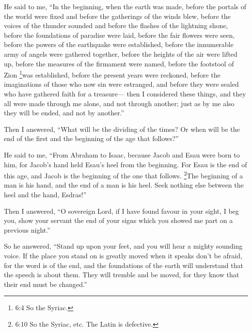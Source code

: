 He said to me, ``In the beginning, when the earth was made,
before the portals of the world were fixed and before the gatherings of
the winds blew,  before the voices of the thunder sounded
and before the flashes of the lightning shone, before the foundations of
paradise were laid,  before the fair flowers were seen,
before the powers of the earthquake were established, before the
innumerable army of angels were gathered together,  before
the heights of the air were lifted up, before the measures of the
firmament were named, before the footstool of Zion \footnote{6:4 So the
  Syriac.}was established,  before the present years were
reckoned, before the imaginations of those who now sin were estranged,
and before they were sealed who have gathered faith for a treasure---
 then I considered these things, and they all were made
through me alone, and not through another; just as by me also they will
be ended, and not by another.''

 Then I answered, ``What will be the dividing of the times?
Or when will be the end of the first and the beginning of the age that
follows?''

 He said to me, ``From Abraham to Isaac, because Jacob and
Esau were born to him, for Jacob's hand held Esau's heel from the
beginning.  For Esau is the end of this age, and Jacob is
the beginning of the one that follows.  \footnote{6:10 So
  the Syriac, etc. The Latin is defective.}The beginning of a man is his
hand, and the end of a man is his heel. Seek nothing else between the
heel and the hand, Esdras!''

 Then I answered, ``O sovereign Lord, if I have found
favour in your sight,  I beg you, show your servant the end
of your signs which you showed me part on a previous night.''

 So he answered, ``Stand up upon your feet, and you will
hear a mighty sounding voice.  If the place you stand on is
greatly moved  when it speaks don't be afraid, for the word
is of the end, and the foundations of the earth will understand
 that the speech is about them. They will tremble and be
moved, for they know that their end must be changed.''

